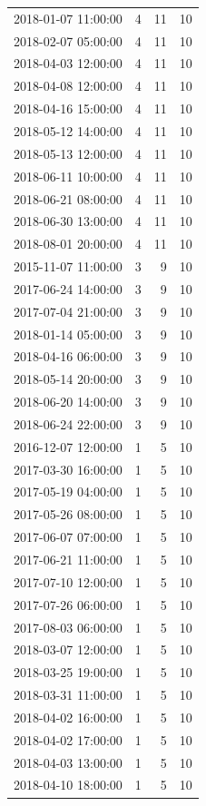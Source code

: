 \begin{tabular}{lrrr}
2018-01-07 11:00:00 & 4 & 11 & 10 \\
2018-02-07 05:00:00 & 4 & 11 & 10 \\
2018-04-03 12:00:00 & 4 & 11 & 10 \\
2018-04-08 12:00:00 & 4 & 11 & 10 \\
2018-04-16 15:00:00 & 4 & 11 & 10 \\
2018-05-12 14:00:00 & 4 & 11 & 10 \\
2018-05-13 12:00:00 & 4 & 11 & 10 \\
2018-06-11 10:00:00 & 4 & 11 & 10 \\
2018-06-21 08:00:00 & 4 & 11 & 10 \\
2018-06-30 13:00:00 & 4 & 11 & 10 \\
2018-08-01 20:00:00 & 4 & 11 & 10 \\
2015-11-07 11:00:00 & 3 & 9 & 10 \\
2017-06-24 14:00:00 & 3 & 9 & 10 \\
2017-07-04 21:00:00 & 3 & 9 & 10 \\
2018-01-14 05:00:00 & 3 & 9 & 10 \\
2018-04-16 06:00:00 & 3 & 9 & 10 \\
2018-05-14 20:00:00 & 3 & 9 & 10 \\
2018-06-20 14:00:00 & 3 & 9 & 10 \\
2018-06-24 22:00:00 & 3 & 9 & 10 \\
2016-12-07 12:00:00 & 1 & 5 & 10 \\
2017-03-30 16:00:00 & 1 & 5 & 10 \\
2017-05-19 04:00:00 & 1 & 5 & 10 \\
2017-05-26 08:00:00 & 1 & 5 & 10 \\
2017-06-07 07:00:00 & 1 & 5 & 10 \\
2017-06-21 11:00:00 & 1 & 5 & 10 \\
2017-07-10 12:00:00 & 1 & 5 & 10 \\
2017-07-26 06:00:00 & 1 & 5 & 10 \\
2017-08-03 06:00:00 & 1 & 5 & 10 \\
2018-03-07 12:00:00 & 1 & 5 & 10 \\
2018-03-25 19:00:00 & 1 & 5 & 10 \\
2018-03-31 11:00:00 & 1 & 5 & 10 \\
2018-04-02 16:00:00 & 1 & 5 & 10 \\
2018-04-02 17:00:00 & 1 & 5 & 10 \\
2018-04-03 13:00:00 & 1 & 5 & 10 \\
2018-04-10 18:00:00 & 1 & 5 & 10 \\

\end{tabular}
